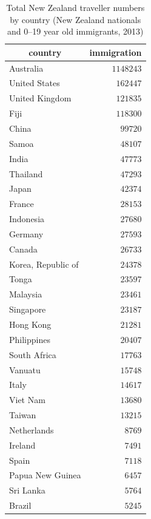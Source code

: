 \documentclass{article}
\begin{document}
\begin{table}
\begin{center}
\begin{tabular}{lr}
\hline\hline
\multicolumn{1}{c}{country}&\multicolumn{1}{c}{immigration}\tabularnewline
\hline
Australia&$1148243$\tabularnewline
United States&$ 162447$\tabularnewline
United Kingdom&$ 121835$\tabularnewline
Fiji&$ 118300$\tabularnewline
China&$  99720$\tabularnewline
Samoa&$  48107$\tabularnewline
India&$  47773$\tabularnewline
Thailand&$  47293$\tabularnewline
Japan&$  42374$\tabularnewline
France&$  28153$\tabularnewline
Indonesia&$  27680$\tabularnewline
Germany&$  27593$\tabularnewline
Canada&$  26733$\tabularnewline
Korea, Republic of&$  24378$\tabularnewline
Tonga&$  23597$\tabularnewline
Malaysia&$  23461$\tabularnewline
Singapore&$  23187$\tabularnewline
Hong Kong&$  21281$\tabularnewline
Philippines&$  20407$\tabularnewline
South Africa&$  17763$\tabularnewline
Vanuatu&$  15748$\tabularnewline
Italy&$  14617$\tabularnewline
Viet Nam&$  13680$\tabularnewline
Taiwan&$  13215$\tabularnewline
Netherlands&$   8769$\tabularnewline
Ireland&$   7491$\tabularnewline
Spain&$   7118$\tabularnewline
Papua New Guinea&$   6457$\tabularnewline
Sri Lanka&$   5764$\tabularnewline
Brazil&$   5245$\tabularnewline
\hline
\end{tabular}\end{center}\caption{Total New Zealand traveller numbers by country (New Zealand nationals and 0--19 year old immigrants, 2013)}
\label{table:immigration12}
\end{table}
\end{document}

